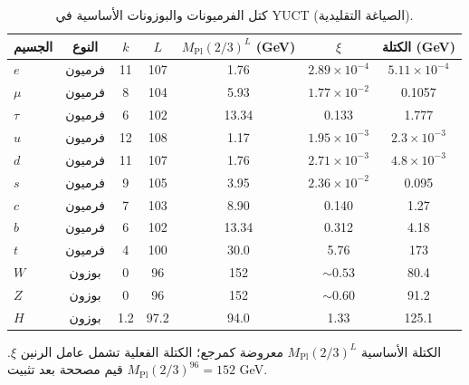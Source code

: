 \documentclass[11pt,a4paper]{article}
\begin{document}
	\vspace{2.0cm}
	
	\begin{table}[H]
		\centering
		\caption{كتل الفرميونات والبوزونات الأساسية في YUCT (الصياغة التقليدية).}
		\label{tab:fermions}
		\normalsize
		\begin{tabular}{l c c c c c c}
			\toprule
			الجسيم & النوع & \(k\) & \(L\) & \(M_{\mathrm{Pl}}(2/3)^L\) (GeV) & \(\xi\) & الكتلة (GeV) \\
			\midrule
			\(e\) & فرميون & 11 & 107 & 1.76 & \(2.89\times10^{-4}\) & \(5.11\times10^{-4}\) \\
			\(\mu\) & فرميون & 8  & 104 & 5.93 & \(1.77\times10^{-2}\) & 0.1057 \\
			\(\tau\) & فرميون & 6  & 102 & 13.34 & 0.133 & 1.777 \\
			\(u\) & فرميون & 12 & 108 & 1.17 & \(1.95\times10^{-3}\) & \(2.3\times10^{-3}\) \\
			\(d\) & فرميون & 11 & 107 & 1.76 & \(2.71\times10^{-3}\) & \(4.8\times10^{-3}\) \\
			\(s\) & فرميون & 9  & 105 & 3.95 & \(2.36\times10^{-2}\) & 0.095 \\
			\(c\) & فرميون & 7  & 103 & 8.90 & 0.140 & 1.27 \\
			\(b\) & فرميون & 6  & 102 & 13.34 & 0.312 & 4.18 \\
			\(t\) & فرميون & 4  & 100 & 30.0 & 5.76 & 173 \\
			\midrule
			\(W\) & بوزون & 0 & 96 & 152 & \(\sim0.53\) & 80.4 \\
			\(Z\) & بوزون & 0 & 96 & 152 & \(\sim0.60\) & 91.2 \\
			\(H\) & بوزون & 1.2 & 97.2 & 94.0 & 1.33 & 125.1 \\
			\bottomrule
		\end{tabular}
		\par\smallskip
		\footnotesize الكتلة الأساسية \(M_{\mathrm{Pl}}(2/3)^L\) معروضة كمرجع؛ الكتلة الفعلية تشمل عامل الرنين \(\xi\). قيم مصححة بعد تثبيت \(M_{\mathrm{Pl}}(2/3)^{96}=152\) GeV.
	\end{table}
	
\end{document}
